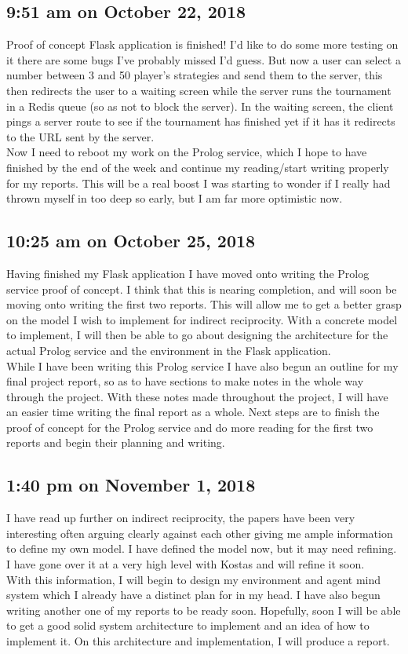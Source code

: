 \documentclass[]{final_report}
\begin{document}
\subsection*{9:51 am on October 22, 2018}
Proof of concept Flask application is finished! I’d like to do some more testing on it there are some bugs I’ve probably missed I’d guess. But now a user can select a number between 3 and 50 player’s strategies and send them to the server, this then redirects the user to a waiting screen while the server runs the tournament in a Redis queue (so as not to block the server). In the waiting screen, the client pings a server route to see if the tournament has finished yet if it has it redirects to the URL sent by the server.\\
Now I need to reboot my work on the Prolog service, which I hope to have finished by the end of the week and continue my reading/start writing properly for my reports. This will be a real boost I was starting to wonder if I really had thrown myself in too deep so early, but I am far more optimistic now.

\subsection*{10:25 am on October 25, 2018}
Having finished my Flask application I have moved onto writing the Prolog service proof of concept. I think that this is nearing completion, and will soon be moving onto writing the first two reports. This will allow me to get a better grasp on the model I wish to implement for indirect reciprocity. With a concrete model to implement, I will then be able to go about designing the architecture for the actual Prolog service and the environment in the Flask application.\\
While I have been writing this Prolog service I have also begun an outline for my final project report, so as to have sections to make notes in the whole way through the project. With these notes made throughout the project, I will have an easier time writing the final report as a whole. Next steps are to finish the proof of concept for the Prolog service and do more reading for the first two reports and begin their planning and writing. 

\subsection*{1:40 pm on November 1, 2018}
I have read up further on indirect reciprocity, the papers have been very interesting often arguing clearly against each other giving me ample information to define my own model. I have defined the model now, but it may need refining. I have gone over it at a very high level with Kostas and will refine it soon.\\
With this information, I will begin to design my environment and agent mind system which I already have a distinct plan for in my head. I have also begun writing another one of my reports to be ready soon. Hopefully, soon I will be able to get a good solid system architecture to implement and an idea of how to implement it. On this architecture and implementation, I will produce a report.
\end{document}
